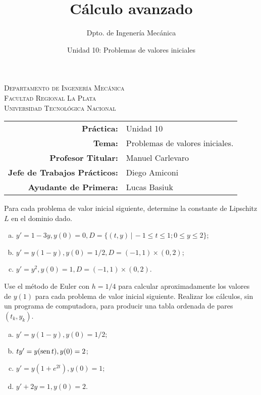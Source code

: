 \documentclass[11pt]{article}
\title{Cálculo avanzado}
\author{Dpto. de Ingenería Mecánica}
\date{Unidad 10: Problemas de valores iniciales}
\begin{document}

\begin{center}
\end{center} 

\begin{center}
\vspace{\baselineskip}
\Large{\textsc{Departamento de Ingenería Mecánica}} \\
\textsc{Facultad Regional La Plata} \\
\textsc{Universidad Tecnológica Nacional}
\end{center}


\begin{center}
\begin{tabular}{r l}
    \textbf{Práctica:} & Unidad 10 \\
 \textbf{Tema:} & Problemas de valores iniciales. \\
 \textbf{Profesor Titular:} & Manuel Carlevaro \\
 \textbf{Jefe de Trabajos Prácticos:} & Diego Amiconi \\
 \textbf{Ayudante de Primera:} & Lucas Basiuk 
\end{tabular}\end{center}

\vspace{1em}

\begin{question} %
Para cada problema de valor inicial siguiente, determine la constante de Lipschitz $L$ en el dominio dado.
\begin{enumerate}[a)]
    \item $y' = 1 - 3y, y(0) = 0, D = \{(t, y) \, | \, -1 \leq t \leq 1; 0 \leq y \leq 2 \}$;
    \item $y' = y(1-y), y(0) = 1/2, D = (-1, 1) \times (0, 2)$;
    \item $y' = y^2, y(0) = 1, D = (-1, 1) \times (0, 2)$.
\end{enumerate}
\end{question}

\begin{question} %
Use el método de Euler con $h = 1/4$ para calcular aproximadamente los valores de $y(1)$ para cada problema de valor inicial siguiente. Realizar los cálculos, sin un programa de computadora, para producir una tabla ordenada de pares $(t_k, y_k)$.
\begin{enumerate}[a)]
    \item $y' = y(1-y), y(0) = 1/2$;
    \item $t y' = y(\operatorname{sen} t), y(0) = 2$;
    \item $y' = y(1 + e^{2 t}), y(0) = 1$;
    \item $y' + 2 y = 1, y(0) = 2$.
\end{enumerate}
\end{question}
\end{document}
